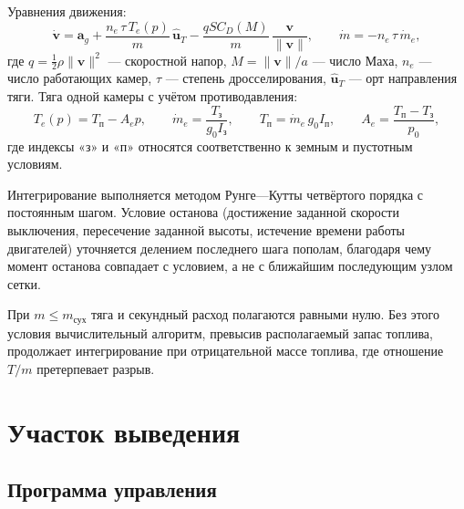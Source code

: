 \documentclass[11pt,a4paper]{article}
\newcommand{\vect}[1]{\bm{#1}}
\begin{document}
Уравнения движения:
\begin{equation}
\dot{\vect{v}} = \vect{a}_g
  + \frac{n_e\,\tau\,T_e(p)}{m}\,\hat{\vect{u}}_T
  - \frac{q S C_D(M)}{m}\,\frac{\vect{v}}{\lVert\vect{v}\rVert},
\qquad
\dot m = -n_e\,\tau\,\dot m_e ,
\end{equation}
где $q=\tfrac12\rho\lVert\vect{v}\rVert^2$ — скоростной напор,
$M=\lVert\vect{v}\rVert/a$ — число Маха, $n_e$ — число работающих камер, $\tau$
— степень дросселирования, $\hat{\vect{u}}_T$ — орт направления тяги. Тяга
одной камеры с учётом противодавления:
\begin{equation}
T_e(p)=T_{\text{п}}-A_e p,
\qquad
\dot m_e = \frac{T_{\text{з}}}{g_0 I_{\text{з}}},
\qquad
T_{\text{п}} = \dot m_e\, g_0 I_{\text{п}},
\qquad
A_e = \frac{T_{\text{п}}-T_{\text{з}}}{p_0},
\end{equation}
где индексы «з» и «п» относятся соответственно к земным и пустотным условиям.

Интегрирование выполняется методом Рунге—Кутты четвёртого порядка с постоянным
шагом. Условие останова (достижение заданной скорости выключения, пересечение
заданной высоты, истечение времени работы двигателей) уточняется делением
последнего шага пополам, благодаря чему момент останова совпадает с условием, а
не с ближайшим последующим узлом сетки.

При $m\le m_{\text{сух}}$ тяга и секундный расход полагаются равными нулю. Без
этого условия вычислительный алгоритм, превысив располагаемый запас топлива,
продолжает интегрирование при отрицательной массе топлива, где отношение $T/m$
претерпевает разрыв.

\section{Участок выведения}

\subsection{Программа управления}
\end{document}

